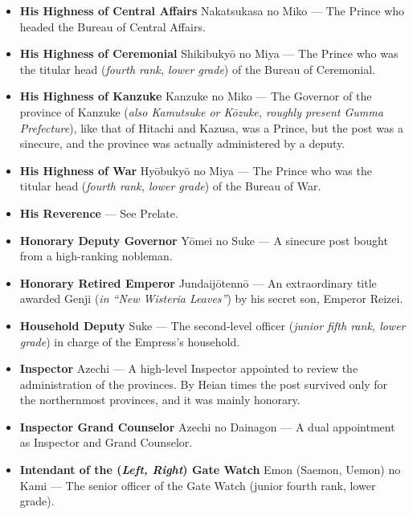 \documentclass{article}
\begin{document}
\begin{multicols}{2}
\begin{small}
\begin{itemize}[
				label=,
				leftmargin=0em,
				rightmargin=-1.5em,
				itemindent=-2em,
			]
			\item \textbf{His Highness of Central Affairs} Nakatsukasa no Miko --- The Prince who headed the Bureau of Central Affairs.

			\item \textbf{His Highness of Ceremonial} Shikibukyō no Miya --- The Prince who was the titular head (\textit{fourth rank, lower grade}) of the Bureau of Ceremonial.

			\item \textbf{His Highness of Kanzuke} Kanzuke no Miko --- The Governor of the province of Kanzuke (\textit{also Kamutsuke or Kōzuke, roughly present Gumma Prefecture}), like that of Hitachi and Kazusa, was a Prince, but the post was a sinecure, and the province was actually administered by a deputy.

			\item \textbf{His Highness of War} Hyōbukyō no Miya --- The Prince who was the titular head (\textit{fourth rank, lower grade}) of the Bureau of War.

			\item \textbf{His Reverence} --- See Prelate.

			\item \textbf{Honorary Deputy Governor} Yōmei no Suke --- A sinecure post bought from a high-ranking nobleman.

			\item \textbf{Honorary Retired Emperor} Jundaijōtennō --- An extraordinary title awarded Genji (\textit{in “New Wisteria Leaves”}) by his secret son, Emperor Reizei.

			\item \textbf{Household Deputy} Suke --- The second-level officer (\textit{junior fifth rank, lower grade}) in charge of the Empress's household.

			\item \textbf{Inspector} Azechi --- A high-level Inspector appointed to review the administration of the provinces. By Heian times the post survived only for the northernmost provinces, and it was mainly honorary.

			\item \textbf{Inspector Grand Counselor} Azechi no Dainagon --- A dual appointment as Inspector and Grand Counselor.

			\item \textbf{Intendant of the (\textit{Left, Right}) Gate Watch} Emon (Saemon, Uemon) no Kami --- The senior officer of the Gate Watch (junior fourth rank, lower grade).


\end{itemize}
\end{small}
\end{multicols}
\end{document}
